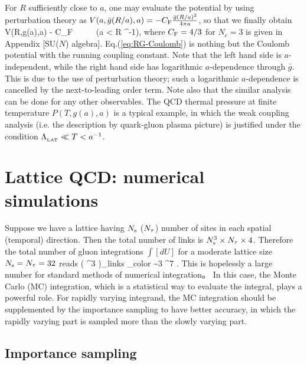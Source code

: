 For $R$ sufficiently close to $a$, one may evaluate the potential by using perturbation theory as
$V (a, \bar{g}(R/a), a)  = - C_{{\rm F}} \frac{\bar{g}(R/a)^2}{4\pi a}$, so that we finally obtain
\beq
\label{eq:RG-Coulomb}
V(R,g(a),a) \simeq - C_{{\rm F}}  \ \ \ \ \ (a < R \ll \Lamlat^{-1}),
\eeq
where $C_{{\rm F}}=4/3$ for $N_c=3$ is given in Appendix [SU($N$) algebra].
Eq.(\ref{eq:RG-Coulomb}) is nothing but the Coulomb potential with the running coupling constant.
Note that the left hand side is $a$-independent, while the right hand side has
logarithmic $a$-dependence through $\bar{g}$.  This is due to the use of perturbation theory;
such a logarithmic $a$-dependence  is cancelled by the next-to-leading order term.
Note also that the similar analysis can be done for any other observables.
The QCD thermal pressure at finite temperature $P(T,g(a),a)$ is a typical example, in which 
the weak coupling analysis (i.e. the description by  quark-gluon plasma picture)
is justified  under the condition  $ \Lambda_{_{\rm LAT}} \ll T < a^{-1}$. 



\section{Lattice QCD:  numerical simulations}


Suppose we have a lattice having $N_{\rm s}$ ($N_{\tau}$) number of sites
in each spatial (temporal) direction. Then 
 the total number of links is 
   $  N_{\rm s}^3 \times N_{\tau}  \times 4$. 
 Therefore the total  number of gluon integrations $\int [dU]$
 for a moderate lattice size  $N_{\rm s} = N_{\tau} =32$ reads
\beq
\label{eq:5.lattice-size}
 ( \Ns^3 \times \Ntau {} )_{\rm links} _{\rm color} 
 \sim 3 ^7 .
 \eeq
 This is 
 hopelessly a large number  
  for standard methods of numerical integration。
   In this case,  the  Monte Carlo (MC) integration,
   which is a
  statistical way to evaluate the integral, plays a 
   powerful role. For rapidly varying integrand,
  the MC integration should be supplemented by the 
 importance sampling 
   to have better accuracy, in which the rapidly varying
   part is sampled more than the slowly varying part.
     
     
\subsection{Importance sampling}
\label{ss:IS}
    
